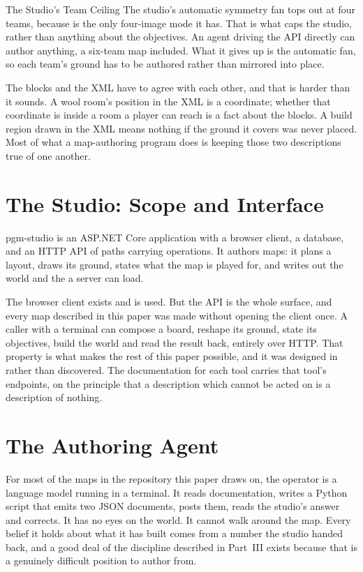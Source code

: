 \begin{ruling}{The Studio's Team Ceiling}
The studio's automatic symmetry fan tops out at four teams, because 
is the only four-image mode it has. That is what caps the studio, rather than
anything about the objectives. An agent driving the API directly can author
anything, a six-team map included. What it gives up is the automatic fan, so each
team's ground has to be authored rather than mirrored into place.
\end{ruling}

The blocks and the XML have to agree with each other, and that is harder than it
sounds. A wool room's position in the XML is a coordinate; whether that coordinate
is inside a room a player can reach is a fact about the blocks. A build region
drawn in the XML means nothing if the ground it covers was never placed. Most of
what a map-authoring program does is keeping those two descriptions true of one
another.

\section{The Studio: Scope and Interface}

\textsf{pgm-studio} is an ASP.NET Core application with a browser client, a
database, and an HTTP API of \RoutePathCount{} paths carrying \RouteCount{}
operations. It authors maps: it plans a layout, draws its ground, states what the
map is played for, and writes out the world and the  a server can
load.

The browser client exists and is used. But the API is the whole surface, and every
map described in this paper was made without opening the client once. A caller
with a terminal can compose a board, reshape its ground, state its objectives,
build the world and read the result back, entirely over HTTP. That property is
what makes the rest of this paper possible, and it was designed in rather than
discovered. The documentation for each tool carries that tool's endpoints, on the
principle that a description which cannot be acted on is a description of nothing.

\section{The Authoring Agent}

For most of the maps in the repository this paper draws on, the operator is a
language model running in a terminal. It reads documentation, writes a Python
script that emits two JSON documents, posts them, reads the studio's answer and
corrects. It has no eyes on the world. It cannot walk around the map. Every belief
it holds about what it has built comes from a number the studio handed back, and a
good deal of the discipline described in Part~III exists because that is a
genuinely difficult position to author from.

